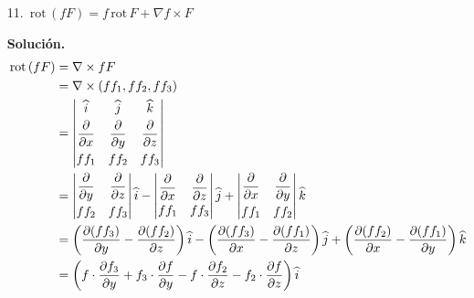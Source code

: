 \documentclass[fleqn, 12pt]{article}
\newcommand{\derivadaparcial}[2]{\dfrac{\partial {#1}}{\partial {#2}}}
\newcommand{\rot}{\mathrm{\, rot \,}}
\begin{document}
\begin{enumerate}
        \item[11.] $ \rot (f F) = f \rot F + \nabla f \times F $
        
        \textbf{Solución.}
        \begin{align*}
            \rot (f F) &= \nabla \times f F \\
            &= \nabla \times (ff_1, ff_2, ff_3) \\
            &= \left\rvert 
            \begin{matrix}
                \widehat{i} & \widehat{j} & \widehat{k} \vspace{1mm} \\
                \derivadaparcial{}{x} & \derivadaparcial{}{y} & \derivadaparcial{}{z} \vspace{1mm} \\
                ff_1 & ff_2 & ff_3
            \end{matrix}
            \right\rvert \\
            &= \left\rvert 
            \begin{matrix}
                \derivadaparcial{}{y} & \derivadaparcial{}{z} \vspace{1mm} \\
                ff_2 & ff_3
            \end{matrix}
            \right\rvert \widehat{i} -
            \left\rvert 
            \begin{matrix}
                \derivadaparcial{}{x} & \derivadaparcial{}{z} \vspace{1mm} \\
                ff_1 & ff_3
            \end{matrix}
            \right\rvert \widehat{j} +
            \left\rvert 
            \begin{matrix}
                \derivadaparcial{}{x} & \derivadaparcial{}{y} \vspace{1mm} \\
                ff_1 & ff_2
            \end{matrix}
            \right\rvert \widehat{k} \\
            &= \left( \derivadaparcial{(ff_3)}{y} - \derivadaparcial{(ff_2)}{z} \right) \widehat{i} - \left( \derivadaparcial{(ff_3)}{x} - \derivadaparcial{(ff_1)}{z} \right) \widehat{j} + \left( \derivadaparcial{(ff_2)}{x} - \derivadaparcial{(ff_1)}{y} \right) \widehat{k} \\
            &= \left( f \cdot \derivadaparcial{f_3}{y} + f_3 \cdot \derivadaparcial{f}{y} - f \cdot \derivadaparcial{f_2}{z} - f_2 \cdot \derivadaparcial{f}{z} \right) \widehat{i} \\ 

\end{align*}
\end{enumerate}
\end{document}
